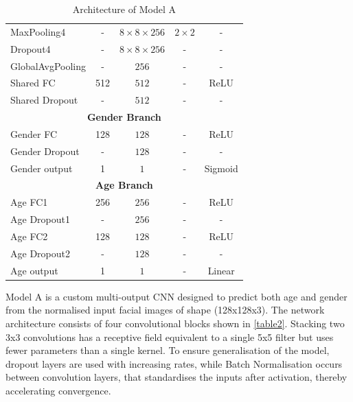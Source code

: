 \documentclass[11pt,a4paper]{article}
\begin{document}
\begin{table}[h!]
\begin{tabular}{||l|c|c|c|c||}
 MaxPooling4        & -    & $8 \times 8 \times 256$     & $2 \times 2$ & -     \\
 Dropout4           & -    & $8 \times 8 \times 256$     & -          & -      \\
 \hline
 GlobalAvgPooling   & -    & $256$                       & -          & -      \\
 Shared FC          & 512  & $512$                       & -          & ReLU  \\
 Shared Dropout     & -    & $512$                       & -          & -      \\
 \hline\hline
 \multicolumn{5}{||c||}{\textbf{Gender Branch}} \\
 \hline
 Gender FC          & 128  & $128$                       & -          & ReLU  \\
 Gender Dropout     & -    & $128$                       & -          & -      \\
 Gender output      & 1    & $1$                         & -          & Sigmoid \\
 \hline\hline
 \multicolumn{5}{||c||}{\textbf{Age Branch}} \\
 \hline
 Age FC1            & 256  & $256$                       & -          & ReLU  \\
 Age Dropout1       & -    & $256$                       & -          & -      \\
 Age FC2            & 128  & $128$                       & -          & ReLU  \\
 Age Dropout2       & -    & $128$                       & -          & -      \\
 Age output         & 1    & $1$                         & -          & Linear \\
 \hline
\end{tabular}
\caption{Architecture of Model A}
\label{table2}
\end{table}

Model A is a custom multi-output CNN designed to predict both age and gender from the normalised input facial images of shape (128x128x3). The network architecture consists of four convolutional blocks shown in \autoref{table2}. Stacking two 3x3 convolutions has a receptive field equivalent to a single 5x5 filter but uses fewer parameters than a single kernel. To ensure generalisation of the model, dropout layers are used with increasing rates, while Batch Normalisation occurs between convolution layers, that standardises the inputs after activation, thereby accelerating convergence.
\end{document}
